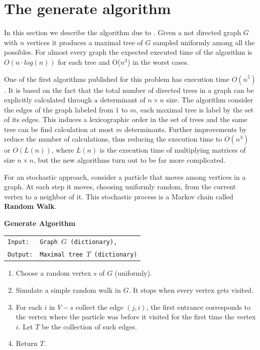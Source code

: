
\chapter{The generate algorithm} %

\label{AppendixA} %


In this section we describe the algorithm due to \cite[Broder]{Broder89}. Given a not directed graph $G$ with $n$ vertices it produces a maximal tree of $G$ sampled uniformly among all the possibles. For almost every graph the expected executed time of the algorithm is $O(n\cdot log(n) )$ for each tree and O($n^{3}$) in the worst cases. 

One of the first algorithms published for this problem has execution time $O (n^{5})$. It is based on the fact that the total number of directed trees in a graph can be explicitly calculated through a determinant of $n \times n$ size. The algorithm consider the edges of the graph labeled from $1$ to $m$, each maximal tree is label by the set of its edges. This induces a lexicographic order in the set of trees and the same tree can be find calculation at most $m$ determinants. Further improvements by \cite{CDM88} reduce the number of calculations, thus reducing the execution time to $O(n^3)$ or $O(L(n))$, where $L(n)$ is the execution time of multiplying matrices of size $n\times n$, but the new algorithms turn out to be far more complicated.

For an stochastic approach, consider a particle that moves among vertices in a graph. At each step it moves, choosing uniformly random, from the current vertex to a neighbor of it. This stochastic process is a Markov chain called \textbf{Random Walk}.

\begin{cajita}
\textbf{Generate Algorithm}\hfill \break
\begin{tabular}{ l l }
\texttt{Input:} &  \texttt{Graph $G$ (dictionary),} \\
\texttt{Output:} & \texttt{Maximal tree $T$ (dictionary)} \\
\end{tabular}

\begin{enumerate}
\item Choose a random vertex $s$ of $G$ (uniformly).
\item Simulate a simple random walk in $G$. It stops when every vertex gets visited. 
\item For each $i$ in $V-s$ collect the edge $(j,i)$, the first entrance corresponds to the vertex where the particle was before it visited for the first time the vertex $i$. Let $T$ be the collection of such edges.
\item Return $T$.
\end{enumerate}
\end{cajita}

